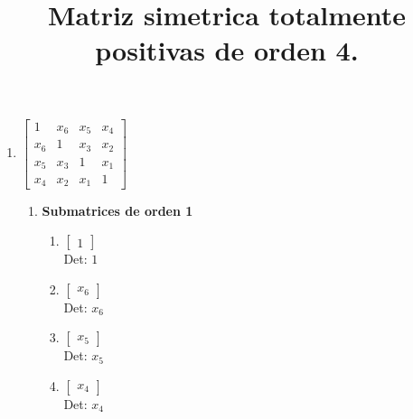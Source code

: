 \documentclass[12pt]{article}
\begin{document}
\title{Matriz simetrica totalmente positivas de orden 4.}
\maketitle


\begin{enumerate}

\item $\left[\begin{matrix}1 & x_{6} & x_{5} & x_{4}\\x_{6} & 1 & x_{3} & x_{2}\\x_{5} & x_{3} & 1 & x_{1}\\x_{4} & x_{2} & x_{1} & 1\end{matrix}\right]$\\

\begin{enumerate}

\item {\bf Submatrices de orden 1}\\

\begin{enumerate}


\item $\displaystyle \left[\begin{matrix}1\end{matrix}\right]$\\

Det: $1$\\


\item $\displaystyle \left[\begin{matrix}x_{6}\end{matrix}\right]$\\

Det: $x_{6}$\\


\item $\displaystyle \left[\begin{matrix}x_{5}\end{matrix}\right]$\\

Det: $x_{5}$\\


\item $\displaystyle \left[\begin{matrix}x_{4}\end{matrix}\right]$\\

Det: $x_{4}$\\



\end{enumerate}
\end{enumerate}
\end{enumerate}
\end{document}
